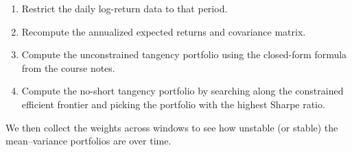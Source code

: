 \documentclass[11pt]{article}
\providecommand{\tightlist}{%
      \setlength{\itemsep}{0pt}\setlength{\parskip}{0pt}}
\begin{document}
\begin{enumerate}
\def\labelenumi{\arabic{enumi}.}
\tightlist
\item
  Restrict the daily log-return data to that period.
\item
  Recompute the annualized expected returns and covariance matrix.
\item
  Compute the unconstrained tangency portfolio using the closed-form
  formula from the course notes.
\item
  Compute the no-short tangency portfolio by searching along the
  constrained efficient frontier and picking the portfolio with the
  highest Sharpe ratio.
\end{enumerate}

We then collect the weights across windows to see how unstable (or
stable) the mean--variance portfolios are over time.
\end{document}
